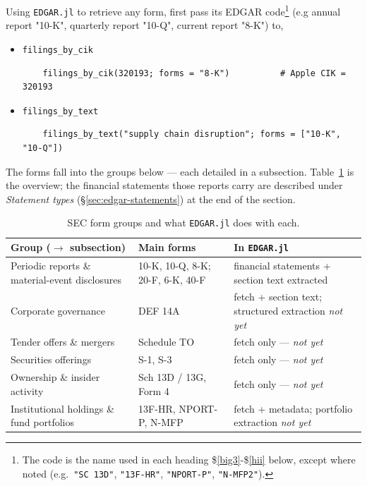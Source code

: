 \documentclass[11pt,a4paper]{report}
\begin{document}
\medskip
\noindent Using \texttt{EDGAR.jl} to retrieve any form, first pass its EDGAR code\footnote{The code is the name used in each heading \$\ref{big3}-\$\ref{hii} below, except where noted (e.g.\ \texttt{"SC 13D"}, \texttt{"13F-HR"}, \texttt{"NPORT-P"}, \texttt{"N-MFP2"}).} (e.g annual report "10-K", quarterly report "10-Q", current report "8-K") to,
\begin{itemize}
  \item \texttt{filings\_by\_cik}
    \begin{lstlisting}
    filings_by_cik(320193; forms = "8-K")          # Apple CIK = 320193
    \end{lstlisting}
  \item \texttt{filings\_by\_text}
    \begin{lstlisting}
    filings_by_text("supply chain disruption"; forms = ["10-K", "10-Q"]) 
    \end{lstlisting}
\end{itemize}

\medskip
\noindent The forms fall into the groups below --- each detailed in a subsection. Table~\ref{tab:edgar-forms}
is the overview; the financial statements those reports carry are described under \emph{Statement types}
(\S\ref{sec:edgar-statements}) at the end of the section.

\begin{table}[h]
\centering
\small
\caption{SEC form groups and what \texttt{EDGAR.jl} does with each.}
\label{tab:edgar-forms}
\begin{tabular}{@{}p{}p{}p{}@{}}
\toprule
\textbf{Group ($\to$ subsection)} & \textbf{Main forms} & \textbf{In \texttt{EDGAR.jl}} \\
\midrule
Periodic reports \& material-event disclosures & 10-K, 10-Q, 8-K; 20-F, 6-K, 40-F & financial statements + section text extracted \\
Corporate governance & DEF 14A & fetch + section text; structured extraction \emph{not yet} \\
Tender offers \& mergers & Schedule TO & fetch only --- \emph{not yet} \\
Securities offerings & S-1, S-3 & fetch only --- \emph{not yet} \\
Ownership \& insider activity & Sch 13D / 13G, Form 4 & fetch only --- \emph{not yet} \\
Institutional holdings \& fund portfolios & 13F-HR, NPORT-P, N-MFP & fetch + metadata; portfolio extraction \emph{not yet} \\
\bottomrule
\end{tabular}
\end{table}
\end{document}
